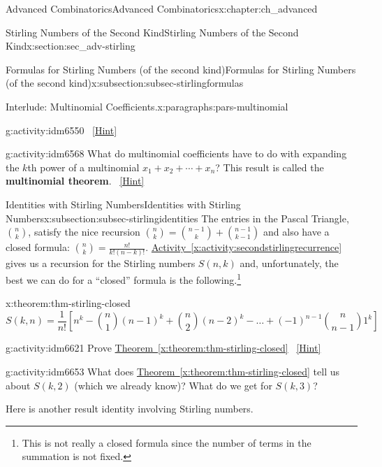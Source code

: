 \documentclass[oneside,10pt,]{book}
\newcommand{\terminology}[1]{\textbf{#1}}
\numberwithin{equation}{chapter}
\begin{document}
\begin{chapterptx}{Advanced Combinatorics}{}{Advanced Combinatorics}{}{}{x:chapter:ch_advanced}
\begin{sectionptx}{Stirling Numbers of the Second Kind}{}{Stirling Numbers of the Second Kind}{}{}{x:section:sec_adv-stirling}
\begin{subsectionptx}{Formulas for Stirling Numbers (of the second kind)}{}{Formulas for Stirling Numbers (of the second kind)}{}{}{x:subsection:subsec-stirlingformulas}
\begin{paragraphs}{Interlude: Multinomial Coefficients.}{x:paragraphs:pars-multinomial}
\begin{activity}{}{g:activity:idm6550}
\qquad~\hfill{\tiny\hyperlink{g:hint:idm6557-back}{[Hint]}}\end{activity}
\begin{activity}{}{g:activity:idm6568}%
What do multinomial coefficients have to do with expanding the \(k\)th power of a multinomial \(x_1+x_2+\cdots+x_n\)? This result is called the \terminology{multinomial theorem}.%
\qquad~\hfill{\tiny\hyperlink{g:hint:idm6574-back}{[Hint]}}\end{activity}
\end{paragraphs}%
\end{subsectionptx}
%
%
\typeout{************************************************}
\typeout{************************************************}
%
\begin{subsectionptx}{Identities with Stirling Numbers}{}{Identities with Stirling Numbers}{}{}{x:subsection:subsec-stirlingidentities}
The entries in the Pascal Triangle, \(\binom{n}{k}\), satisfy the nice recursion \(\binom{n}{k} = \binom{n - 1}{k} + \binom{n - 1}{k - 1}\) and also have a closed formula: \(\binom{n}{k} = \frac{n!}{k!(n - k)!}\). \hyperref[x:activity:secondstirlingrecurrence]{Activity~\ref{x:activity:secondstirlingrecurrence}} gives us a recursion for the Stirling numbers \(S(n,k)\) and, unfortunately, the best we can do for a ``closed'' formula is the following.\footnote{This is not really a closed formula since the number of terms in the summation is not fixed.\label{g:fn:idm6616}}%
\begin{theorem}{}{}{x:theorem:thm-stirling-closed}%
%
\begin{equation*}
S(k,n) = \frac{1}{n!}\left[n^{k} - \binom{n}{1} \left( n - 1 \right)^{k} + \binom{n}{2} \left( n - 2 \right)^{k} - \ldots + \left( - 1 \right)^{n - 1}\binom{n}{n - 1} 1^{k} \right] 
\end{equation*}
%
\end{theorem}
\begin{activity}{}{g:activity:idm6621}%
Prove \hyperref[x:theorem:thm-stirling-closed]{Theorem~\ref{x:theorem:thm-stirling-closed}}%
\qquad~\hfill{\tiny\hyperlink{g:hint:idm6625-back}{[Hint]}}\end{activity}
\begin{activity}{}{g:activity:idm6653}%
What does \hyperref[x:theorem:thm-stirling-closed]{Theorem~\ref{x:theorem:thm-stirling-closed}} tell us about \(S(k, 2)\) (which we already know)?  What do we get for \(S(k,3)\)?%
\end{activity}
Here is another result identity involving Stirling numbers.%

\end{subsectionptx}
\end{sectionptx}
\end{chapterptx}
\end{document}
